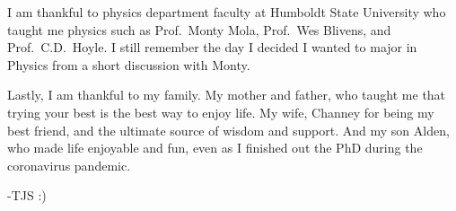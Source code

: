 \begin{acknowledgements}
    I am thankful to physics department faculty at Humboldt State University who taught me physics such as Prof.\ Monty Mola, Prof.\ Wes Blivens, and Prof.\ C.D.\ Hoyle. I still remember the day I decided I wanted to major in Physics from a short discussion with Monty.

    Lastly, I am thankful to my family. My mother and father, who taught me that trying your best is the best way to enjoy life. My wife, Channey for being my best friend, and the ultimate source of wisdom and support. And my son Alden, who made life enjoyable and fun, even as I finished out the PhD during the coronavirus pandemic.


    \hfill -TJS :)
\end{acknowledgements}
